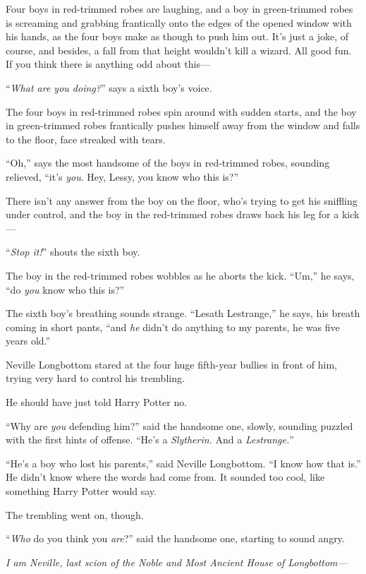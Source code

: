 Four boys in red-trimmed robes are laughing, and a boy in green-trimmed robes is screaming and grabbing frantically onto the edges of the opened window with his hands, as the four boys make as though to push him out. It’s just a joke, of course, and besides, a fall from that height wouldn’t kill a wizard. All good fun. If you think there is anything odd about this—

“\emph{What are you doing?}” says a sixth boy’s voice.

The four boys in red-trimmed robes spin around with sudden starts, and the boy in green-trimmed robes frantically pushes himself away from the window and falls to the floor, face streaked with tears.

“Oh,” says the most handsome of the boys in red-trimmed robes, sounding relieved, “it’s \emph{you}. Hey, Lessy, you know who this is?”

There isn’t any answer from the boy on the floor, who’s trying to get his sniffling under control, and the boy in the red-trimmed robes draws back his leg for a kick—

“\emph{Stop it!}” shouts the sixth boy.

The boy in the red-trimmed robes wobbles as he aborts the kick. “Um,” he says, “do \emph{you} know who this is?”

The sixth boy’s breathing sounds strange. “Lesath Lestrange,” he says, his breath coming in short pants, “and \emph{he} didn’t do anything to my parents, he was five years old.”

\later

Neville Longbottom stared at the four huge fifth-year bullies in front of him, trying very hard to control his trembling.

He should have just told Harry Potter no.

“Why are \emph{you} defending him?” said the handsome one, slowly, sounding puzzled with the first hints of offense. “He’s a \emph{Slytherin.} And a \emph{Lestrange.}”

“He’s a boy who lost his parents,” said Neville Longbottom. “I know how that is.” He didn’t know where the words had come from. It sounded too cool, like something Harry Potter would say.

The trembling went on, though.

“\emph{Who} do you think you \emph{are}?” said the handsome one, starting to sound angry.

\emph{I am Neville, last scion of the Noble and Most Ancient House of Longbottom—}

